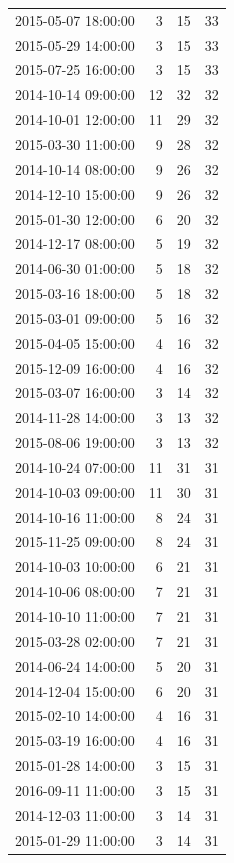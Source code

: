 \begin{tabular}{lrrr}
2015-05-07 18:00:00 & 3 & 15 & 33 \\
2015-05-29 14:00:00 & 3 & 15 & 33 \\
2015-07-25 16:00:00 & 3 & 15 & 33 \\
2014-10-14 09:00:00 & 12 & 32 & 32 \\
2014-10-01 12:00:00 & 11 & 29 & 32 \\
2015-03-30 11:00:00 & 9 & 28 & 32 \\
2014-10-14 08:00:00 & 9 & 26 & 32 \\
2014-12-10 15:00:00 & 9 & 26 & 32 \\
2015-01-30 12:00:00 & 6 & 20 & 32 \\
2014-12-17 08:00:00 & 5 & 19 & 32 \\
2014-06-30 01:00:00 & 5 & 18 & 32 \\
2015-03-16 18:00:00 & 5 & 18 & 32 \\
2015-03-01 09:00:00 & 5 & 16 & 32 \\
2015-04-05 15:00:00 & 4 & 16 & 32 \\
2015-12-09 16:00:00 & 4 & 16 & 32 \\
2015-03-07 16:00:00 & 3 & 14 & 32 \\
2014-11-28 14:00:00 & 3 & 13 & 32 \\
2015-08-06 19:00:00 & 3 & 13 & 32 \\
2014-10-24 07:00:00 & 11 & 31 & 31 \\
2014-10-03 09:00:00 & 11 & 30 & 31 \\
2014-10-16 11:00:00 & 8 & 24 & 31 \\
2015-11-25 09:00:00 & 8 & 24 & 31 \\
2014-10-03 10:00:00 & 6 & 21 & 31 \\
2014-10-06 08:00:00 & 7 & 21 & 31 \\
2014-10-10 11:00:00 & 7 & 21 & 31 \\
2015-03-28 02:00:00 & 7 & 21 & 31 \\
2014-06-24 14:00:00 & 5 & 20 & 31 \\
2014-12-04 15:00:00 & 6 & 20 & 31 \\
2015-02-10 14:00:00 & 4 & 16 & 31 \\
2015-03-19 16:00:00 & 4 & 16 & 31 \\
2015-01-28 14:00:00 & 3 & 15 & 31 \\
2016-09-11 11:00:00 & 3 & 15 & 31 \\
2014-12-03 11:00:00 & 3 & 14 & 31 \\
2015-01-29 11:00:00 & 3 & 14 & 31 \\

\end{tabular}
